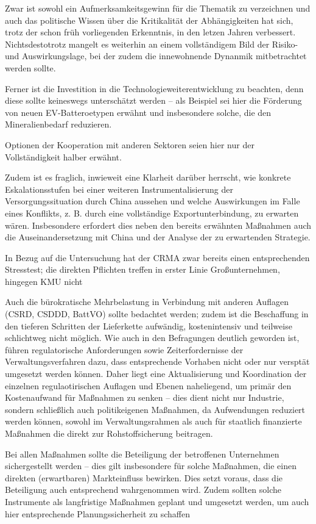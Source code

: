 \documentclass[12pt,a4paper,oneside]{book} %
\begin{document}
Zwar ist sowohl ein Aufmerksamkeitsgewinn für die Thematik zu verzeichnen und auch das politische Wissen über die Kritikalität der Abhängigkeiten hat sich, trotz der schon früh vorliegenden Erkenntnis, in den letzen Jahren verbessert. Nichtsdestotrotz mangelt es weiterhin an einem vollständigem Bild der Risiko- und Auswirkungslage, bei der zudem die innewohnende Dynanmik mitbetrachtet werden sollte.

Ferner ist die Investition in die Technologieweiterentwicklung zu beachten, denn diese sollte keineswegs unterschätzt werden -- als Beispiel sei hier die Förderung von neuen EV-Batteroetypen erwähnt und insbesondere solche, die den Mineralienbedarf reduzieren.

Optionen der Kooperation mit anderen Sektoren seien hier nur der Vollständigkeit halber erwähnt.

Zudem ist es fraglich, inwieweit eine Klarheit darüber herrscht, wie konkrete Eskalationsstufen bei einer weiteren Instrumentalisierung der Versorgungssituation durch China aussehen und welche Auswirkungen im Falle eines Konflikts, z. B. durch eine vollständige Exportunterbindung, zu erwarten wären. Insbesondere erfordert dies neben den bereits erwähnten Maßnahmen auch die Auseinandersetzung mit China und der Analyse der zu erwartenden Strategie.

In Bezug auf die Untersuchung hat der CRMA zwar bereits einen entsprechenden Stresstest; die direkten Pflichten treffen in erster Linie Großunternehmen, hingegen KMU nicht

Auch die bürokratische Mehrbelastung in Verbindung mit anderen Auflagen (CSRD, CSDDD, BattVO) sollte bedachtet werden; zudem ist die Beschaffung in den tieferen Schritten der Lieferkette aufwändig, kostenintensiv und teilweise schlichtweg nicht möglich. Wie auch in den Befragungen deutlich geworden ist, führen regulatorische Anforderungen sowie Zeiterfordernisse der Verwaltungsverfahren dazu, dass entsprechende Vorhaben nicht oder nur versptät umgesetzt werden können. Daher liegt eine Aktualisierung und Koordination der einzelnen regulaotirischen Auflagen und Ebenen naheliegend, um primär den Kostenaufwand für Maßnahmen zu senken -- dies dient nicht nur Industrie, sondern schließlich auch politikeigenen Maßnahmen, da Aufwendungen reduziert werden können, sowohl im Verwaltungsrahmen als auch für staatlich finanzierte Maßnahmen die direkt zur Rohstoffsicherung beitragen. 

Bei allen Maßnahmen sollte die Beteiligung der betroffenen Unternehmen sichergestellt werden -- dies gilt insbesondere für solche Maßnahmen, die einen direkten (erwartbaren) Markteinfluss bewirken. Dies setzt voraus, dass die Beteiligung auch entsprechend wahrgenommen wird.
Zudem sollten solche Instrumente als langfristige Maßnahmen geplant und umgesetzt werden, um auch hier entsprechende Planungssicherheit zu schaffen
\end{document}
